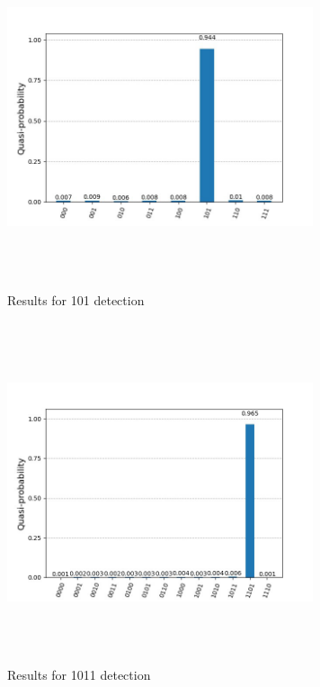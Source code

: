 \documentclass[conference]{IEEEtran}
\begin{document}
\begin{figure}[htbp]
	\centerline{\includegraphics[width=9cm,height=10cm,keepaspectratio]{3_qubit.png}}
	\caption{Results for 101 detection}
	\label{fig:3_qubit}
\end{figure}

\begin{figure}[htbp]
	\centerline{\includegraphics[width=9cm,height=10cm,keepaspectratio]{4_qubit.png}}
	\caption{Results for 1011 detection}
	\label{fig:4_qubit}
\end{figure}
\end{document}
